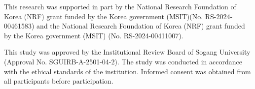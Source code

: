\documentclass[pdflatex,iicol,sn-mathphys-ay]{sn-jnl}
\begin{document}
\maketitle









This research was supported in part by the National Research Foundation of Korea (NRF) grant funded by the Korea government (MSIT)(No. RS-2024-00461583) and the National Research Foundation of Korea (NRF) grant funded by the Korea government (MSIT) (No. RS-2024-00411007).

This study was approved by the Institutional Review Board of Sogang University (Approval No. SGUIRB-A-2501-04-2). The study was conducted in accordance with the ethical standards of the institution. Informed consent was obtained from all participants before participation.



\begin{appendices}






\end{appendices}
\end{document}
